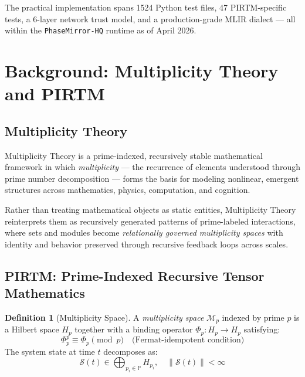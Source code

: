 \documentclass[12pt,letterpaper]{article}
\theoremstyle{definition}
\newtheorem{definition}{Definition}[section]
\theoremstyle{remark}
\begin{document}
The practical implementation spans 1524 Python test files, 47 PIRTM-specific tests, a 6-layer network trust model, and a production-grade MLIR dialect --- all within the \texttt{PhaseMirror-HQ} runtime as of April 2026.

\section{Background: Multiplicity Theory and PIRTM}

\subsection{Multiplicity Theory}

Multiplicity Theory is a prime-indexed, recursively stable mathematical framework in which \emph{multiplicity} --- the recurrence of elements understood through prime number decomposition --- forms the basis for modeling nonlinear, emergent structures across mathematics, physics, computation, and cognition.

Rather than treating mathematical objects as static entities, Multiplicity Theory reinterprets them as recursively generated patterns of prime-labeled interactions, where sets and modules become \emph{relationally governed multiplicity spaces} with identity and behavior preserved through recursive feedback loops across scales.

\subsection{PIRTM: Prime-Indexed Recursive Tensor Mathematics}

\begin{definition}[Multiplicity Space]
A \emph{multiplicity space} $\mathcal{M}_p$ indexed by prime $p$ is a Hilbert space $H_p$ together with a binding operator $\Phi_p: H_p \to H_p$ satisfying:
\begin{equation}
\Phi_p^p \equiv \Phi_p \pmod{p} \quad \text{(Fermat-idempotent condition)}
\end{equation}
The system state at time $t$ decomposes as:
\begin{equation}
\mathcal{S}(t) \in \bigoplus_{p_i \in \mathbb{P}} H_{p_i}, \quad \|\mathcal{S}(t)\| < \infty
\end{equation}
\end{definition}
\end{document}
